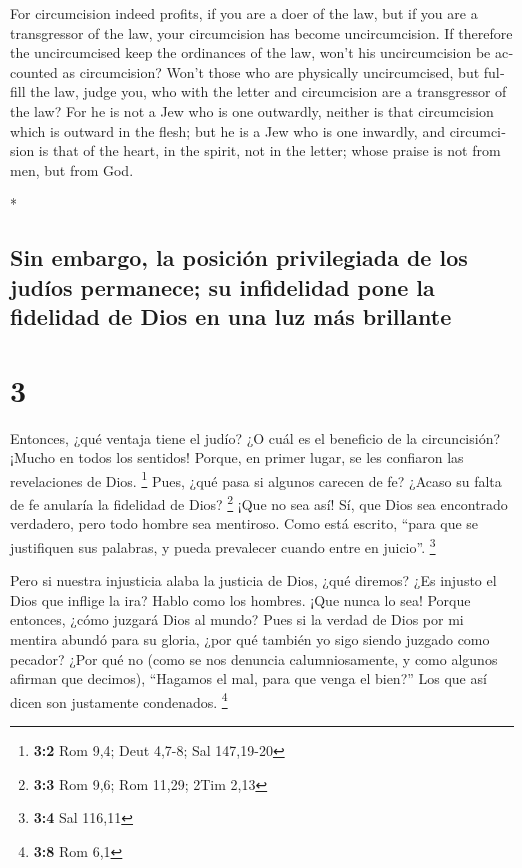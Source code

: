 \begin{paracol}{2}
\begin{otherlanguage}{english}
 For circumcision indeed profits, if you are a doer of
the law, but if you are a transgressor of the law, your circumcision has
become uncircumcision.  If therefore the uncircumcised
keep the ordinances of the law, won't his uncircumcision be accounted as
circumcision?  Won't those who are physically
uncircumcised, but fulfill the law, judge you, who with the letter and
circumcision are a transgressor of the law?  For he is
not a Jew who is one outwardly, neither is that circumcision which is
outward in the flesh;  but he is a Jew who is one
inwardly, and circumcision is that of the heart, in the spirit, not in
the letter; whose praise is not from men, but from God.

\end{otherlanguage}

\switchcolumn[0]*

\hypertarget{sin-embargo-la-posiciuxf3n-privilegiada-de-los-juduxedos-permanece-su-infidelidad-pone-la-fidelidad-de-dios-en-una-luz-muxe1s-brillante}{%
\subsection{Sin embargo, la posición privilegiada de los judíos
permanece; su infidelidad pone la fidelidad de Dios en una luz más
brillante}\label{sin-embargo-la-posiciuxf3n-privilegiada-de-los-juduxedos-permanece-su-infidelidad-pone-la-fidelidad-de-dios-en-una-luz-muxe1s-brillante}}

\hypertarget{section-4}{%
\section{3}\label{section-4}}

 Entonces, ¿qué ventaja tiene el judío? ¿O cuál es el
beneficio de la circuncisión?  ¡Mucho en todos los
sentidos! Porque, en primer lugar, se les confiaron las revelaciones de
Dios. \footnote{\textbf{3:2} Rom 9,4; Deut 4,7-8; Sal 147,19-20}
 Pues, ¿qué pasa si algunos carecen de fe? ¿Acaso su falta
de fe anularía la fidelidad de Dios? \footnote{\textbf{3:3} Rom 9,6; Rom
  11,29; 2Tim 2,13}  ¡Que no sea así! Sí, que Dios sea
encontrado verdadero, pero todo hombre sea mentiroso. Como está escrito,
``para que se justifiquen sus palabras, y pueda prevalecer cuando entre
en juicio''. \footnote{\textbf{3:4} Sal 116,11}

 Pero si nuestra injusticia alaba la justicia de Dios,
¿qué diremos? ¿Es injusto el Dios que inflige la ira? Hablo como los
hombres.  ¡Que nunca lo sea! Porque entonces, ¿cómo
juzgará Dios al mundo?  Pues si la verdad de Dios por mi
mentira abundó para su gloria, ¿por qué también yo sigo siendo juzgado
como pecador?  ¿Por qué no (como se nos denuncia
calumniosamente, y como algunos afirman que decimos), ``Hagamos el mal,
para que venga el bien?'' Los que así dicen son justamente condenados.
\footnote{\textbf{3:8} Rom 6,1}


\end{paracol}
